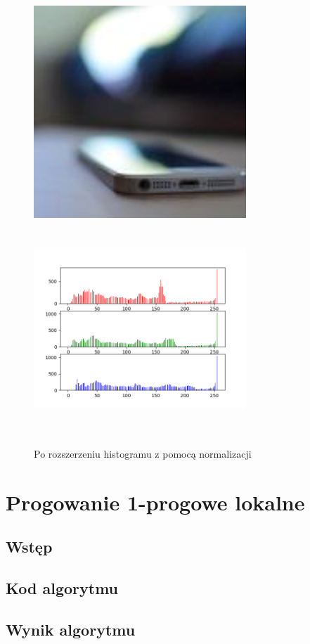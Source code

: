 \documentclass[a4paper,12pt]{book}
\begin{document}
\begin{figure}[H]
	\caption{Po rozszerzeniu histogramu z pomocą normalizacji}
	\includegraphics[width=8cm, height=8cm]{6-3/extend-histogram-image-phone-dark.png}
	\includegraphics[width=8cm, height=8cm]{6-3/extend-histogram-phone-dark.png}
\end{figure}

\section{Progowanie 1-progowe lokalne}
\subsection*{Wstęp}
\subsection*{Kod algorytmu}
\subsection*{Wynik algorytmu}
\end{document}

